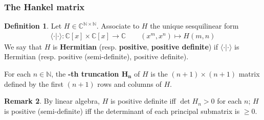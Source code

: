 \documentclass[12pt,b5paper,notitlepage]{article}
\theoremstyle{definition}
\newtheorem{df}{Definition}[section]
\newtheorem{rem}[df]{Remark}
\theoremstyle{plain}
\newcommand{\bk}[1]{\langle {#1}\rangle}
\newcommand{\Cbb}{\mathbb C}
\newcommand{\Nbb}{\mathbb N}
\numberwithin{equation}{section}
\begin{document}
\subsubsection{The Hankel matrix}


\begin{df}
Let $H\in\Cbb^{\Nbb\times\Nbb}$. Associate to $H$ the unique sesquilinear form
\begin{align*}
\bk{\cdot|\cdot}:\Cbb[x]\times\Cbb[x]\rightarrow\Cbb\qquad (x^m,x^n)\mapsto H(m,n)
\end{align*} 
We say that $H$ is \textbf{Hermitian} (resp. \textbf{positive}, \textbf{positive definite}) if $\bk{\cdot|\cdot}$ is Hermitian (resp. positive (semi-definite), positive definite). 

For each $n\in\Nbb$, the \textbf{-th truncation $\pmb{H_n}$} of $H$ is the $(n+1)\times(n+1)$ matrix defined by the first $(n+1)$ rows and columns of $H$. \hfill
\end{df}


\begin{rem}
By linear algebra, $H$ is positive definite iff $\det H_n>0$ for each $n$; $H$ is positive (semi-definite) iff the determinant of each principal submatrix is $\geq0$.
\end{rem}
\end{document}
